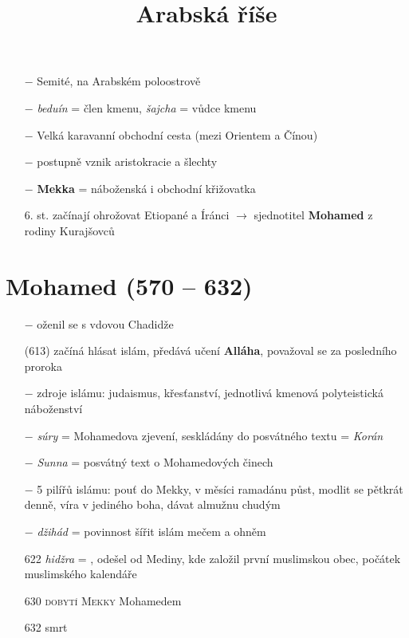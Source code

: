 \documentclass{article}
\title{\vspace{-2cm}Arabská říše\vspace{-1.7cm}}
\date{}
\author{}
\begin{document}
\maketitle

\begin{itemize}
    \vspace{-0.5em}
    \setlength\itemsep{0.15em}
    \item[$-$] Semité, na Arabském poloostrově
    \item[$-$] \textit{beduín} = člen kmenu, \textit{šajcha} = vůdce kmenu
    \item[$-$] Velká karavanní obchodní cesta (mezi Orientem a Čínou)
    \item[$-$] postupně vznik aristokracie a šlechty
    \item[$-$] \textbf{Mekka} = náboženská i obchodní křižovatka
    \item[6. st.] začínají ohrožovat Etiopané a Íránci $\rightarrow$ sjednotitel \textbf{Mohamed} z rodiny Kurajšovců
\end{itemize}

\section*{Mohamed (570 -- 632)}
\begin{itemize}
    \vspace{-0.5em}
    \setlength\itemsep{0.15em}
    \item[$-$] oženil se s vdovou Chadidže
    \item[(613)] začíná hlásat islám, předává učení \textbf{Alláha}, považoval se za posledního proroka
    \item[$-$] zdroje islámu: judaismus, křesťanství, jednotlivá kmenová polyteistická náboženství
    \item[$-$] \textit{súry} = Mohamedova zjevení, seskládány do posvátného textu = \textit{Korán}
    \item[$-$] \textit{Sunna} = posvátný text o Mohamedových činech
    \item[$-$] 5 pilířů islámu: pouť do Mekky, v měsíci ramadánu půst, modlit se pětkrát denně, víra v jediného boha, dávat almužnu chudým
    \item[$-$] \textit{džihád} = povinnost šířit islám mečem a ohněm
    \item[622] \textit{hidžra} = , odešel od Mediny, kde založil první muslimskou obec, počátek muslimského kalendáře
    \item[630] \textsc{dobytí Mekky} Mohamedem
    \item[632] smrt
\end{itemize}
\end{document}
